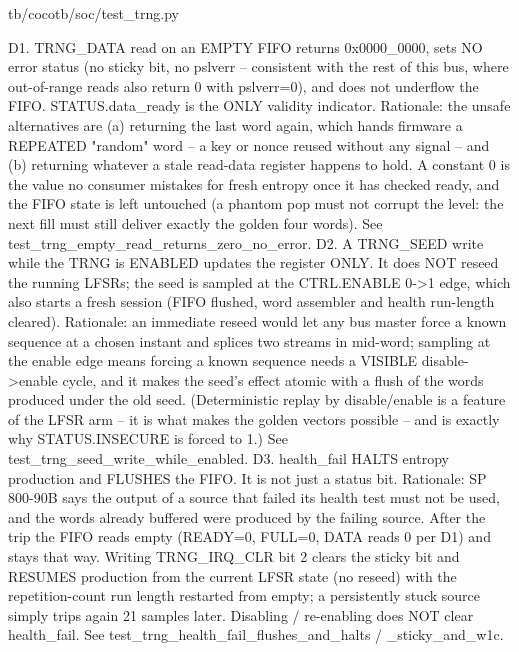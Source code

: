 \begin{relocated}{tb/cocotb/soc/test_trng.py}
\begin{textblock}
D1. TRNG_DATA read on an EMPTY FIFO returns 0x0000_0000, sets NO error status (no sticky bit, no
pslverr -- consistent with the rest of this bus, where out-of-range reads also return 0
with pslverr=0), and does not underflow the FIFO. STATUS.data_ready is the ONLY validity
indicator. Rationale: the unsafe alternatives are (a) returning the last word again, which
hands firmware a REPEATED "random" word -- a key or nonce reused without any signal -- and
(b) returning whatever a stale read-data register happens to hold. A constant 0 is the value
no consumer mistakes for fresh entropy once it has checked ready, and the FIFO state is left
untouched (a phantom pop must not corrupt the level: the next fill must still deliver exactly
the golden four words). See test_trng_empty_read_returns_zero_no_error.
D2. A TRNG_SEED write while the TRNG is ENABLED updates the register ONLY. It does NOT reseed the
running LFSRs; the seed is sampled at the CTRL.ENABLE 0->1 edge, which also starts a fresh
session (FIFO flushed, word assembler and health run-length cleared). Rationale: an
immediate reseed would let any bus master force a known sequence at a chosen instant and
splices two streams in mid-word; sampling at the enable edge means forcing a known sequence
needs a VISIBLE disable->enable cycle, and it makes the seed's effect atomic with a flush of
the words produced under the old seed. (Deterministic replay by disable/enable is a feature
of the LFSR arm -- it is what makes the golden vectors possible -- and is exactly why
STATUS.INSECURE is forced to 1.) See test_trng_seed_write_while_enabled.
D3. health_fail HALTS entropy production and FLUSHES the FIFO. It is not just a status bit.
Rationale: SP 800-90B says the output of a source that failed its health test must not be
used, and the words already buffered were produced by the failing source. After the trip the
FIFO reads empty (READY=0, FULL=0, DATA reads 0 per D1) and stays that way. Writing
TRNG_IRQ_CLR bit 2 clears the sticky bit and RESUMES production from the current LFSR state
(no reseed) with the repetition-count run length restarted from empty; a persistently stuck
source simply trips again 21 samples later. Disabling / re-enabling does NOT clear
health_fail. See test_trng_health_fail_flushes_and_halts / _sticky_and_w1c.


\end{textblock}
\end{relocated}
